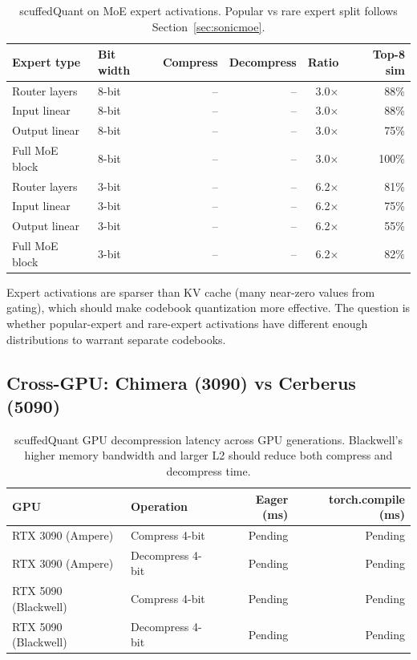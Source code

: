 \documentclass[11pt,letterpaper]{article}
\begin{document}
\begin{table}[ht]
\centering\small
\begin{tabular}{llrrrr}
\toprule
\textbf{Expert type} & \textbf{Bit width} & \textbf{Compress} & \textbf{Decompress} & \textbf{Ratio} & \textbf{Top-8 sim} \\
\midrule
Router layers & 8-bit & -- & -- & 3.0$\times$ & 88\% \\
Input linear & 8-bit & -- & -- & 3.0$\times$ & 88\% \\
Output linear & 8-bit & -- & -- & 3.0$\times$ & 75\% \\
Full MoE block & 8-bit & -- & -- & 3.0$\times$ & 100\% \\
\addlinespace
Router layers & 3-bit & -- & -- & 6.2$\times$ & 81\% \\
Input linear & 3-bit & -- & -- & 6.2$\times$ & 75\% \\
Output linear & 3-bit & -- & -- & 6.2$\times$ & 55\% \\
Full MoE block & 3-bit & -- & -- & 6.2$\times$ & 82\% \\
\bottomrule
\end{tabular}
\caption{scuffedQuant on MoE expert activations. Popular vs rare expert split follows Section~\ref{sec:sonicmoe}.}
\label{tab:sq_moe}
\end{table}

Expert activations are sparser than KV cache (many near-zero values from gating), which should make codebook quantization more effective. The question is whether popular-expert and rare-expert activations have different enough distributions to warrant separate codebooks.

\subsection{Cross-GPU: Chimera (3090) vs Cerberus (5090)}
\label{sec:cross_gpu}

\begin{table}[ht]
\centering\small
\begin{tabular}{llrr}
\toprule
\textbf{GPU} & \textbf{Operation} & \textbf{Eager (ms)} & \textbf{torch.compile (ms)} \\
\midrule
RTX 3090 (Ampere) & Compress 4-bit & Pending & Pending \\
RTX 3090 (Ampere) & Decompress 4-bit & Pending & Pending \\
RTX 5090 (Blackwell) & Compress 4-bit & Pending & Pending \\
RTX 5090 (Blackwell) & Decompress 4-bit & Pending & Pending \\
\bottomrule
\end{tabular}
\caption{scuffedQuant GPU decompression latency across GPU generations. Blackwell's higher memory bandwidth and larger L2 should reduce both compress and decompress time.}
\label{tab:gpu_decompress}
\end{table}
\end{document}
